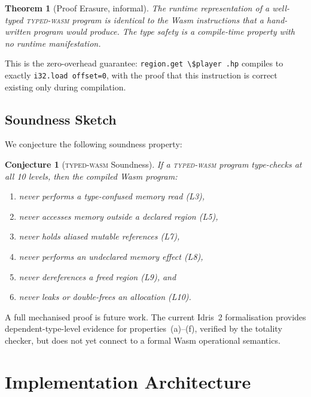 \documentclass[11pt,a4paper]{article}
\newtheorem{theorem}{Theorem}
\newtheorem{conjecture}{Conjecture}
\newcommand{\typedwasm}{\textsc{typed-wasm}}
\begin{document}
\begin{theorem}[Proof Erasure, informal]
\label{thm:erasure}
The runtime representation of a well-typed \typedwasm{} program is
identical to the Wasm instructions that a hand-written program would
produce.  The type safety is a compile-time property with no runtime
manifestation.
\end{theorem}

This is the zero-overhead guarantee: \lstinline{region.get \$player .hp}
compiles to exactly \lstinline{i32.load offset=0}, with the proof that
this instruction is correct existing only during compilation.

\subsection{Soundness Sketch}
\label{sec:soundness}

We conjecture the following soundness property:

\begin{conjecture}[\typedwasm{} Soundness]
\label{conj:soundness}
If a \typedwasm{} program type-checks at all 10 levels, then the
compiled Wasm program:
\begin{enumerate}[label=(\alph*)]
  \item never performs a type-confused memory read (L3),
  \item never accesses memory outside a declared region (L5),
  \item never holds aliased mutable references (L7),
  \item never performs an undeclared memory effect (L8),
  \item never dereferences a freed region (L9), and
  \item never leaks or double-frees an allocation (L10).
\end{enumerate}
\end{conjecture}

A full mechanised proof is future work.  The current Idris~2
formalisation provides dependent-type-level evidence for
properties~(a)--(f), verified by the totality checker, but does not yet
connect to a formal Wasm operational semantics.

\section{Implementation Architecture}
\label{sec:implementation}
\end{document}

